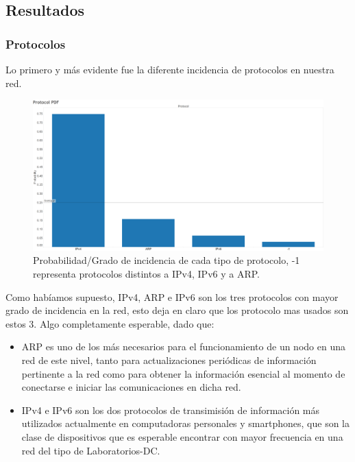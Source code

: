 \documentclass{article}
\theoremstyle{definition}
\theoremstyle{remark}
\begin{document}
\subsection{Resultados}

\subsubsection{Protocolos}

Lo primero y más evidente fue la diferente incidencia de protocolos en nuestra red.

\begin{figure}[H]
\centering
\includegraphics[width=450pt]{captures/LabosDC/Protocol PDF Dashboard Probabilitidad.png}
\caption{Probabilidad/Grado de incidencia de cada tipo de protocolo, -1 representa protocolos distintos a IPv4, IPv6 y a ARP.}
\end{figure}

Como habíamos supuesto, IPv4, ARP e IPv6 son los tres protocolos con mayor grado de incidencia en la red, esto deja en claro que los protocolo mas usados son estos 3. Algo completamente esperable, dado que:

\begin{itemize}
 
\item ARP es uno de los más necesarios para el funcionamiento de un nodo en una red de este nivel, tanto para actualizaciones periódicas de información pertinente a la red como para obtener la información esencial al momento de conectarse e iniciar las comunicaciones en dicha red.

\item IPv4 e IPv6 son los dos protocolos de transimisión de información más utilizados actualmente en computadoras personales y smartphones, que son la clase de dispositivos que es esperable encontrar con mayor frecuencia en una red del tipo de Laboratorios-DC.

\end{itemize}
\end{document}

